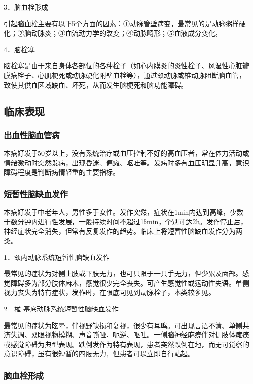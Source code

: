3．脑血栓形成

引起脑血栓主要有以下5个方面的因素：①动脉管壁病变，最常见的是动脉粥样硬化；②脑动脉炎；③血流动力学的改变；④动脉畸形；⑤血液成分变化。

4．脑栓塞

脑栓塞是由于来自身体各部位的各种栓子（如心内膜炎的炎性栓子、风湿性心脏瓣膜病栓子、心肌梗死或动脉硬化附壁血栓等），通过颈动脉或椎动脉阻断脑血管，致使其供血区域缺血、坏死，从而发生脑梗死和脑功能障碍。

\subsection{临床表现}

\subsubsection{出血性脑血管病}

本病好发于50岁以上，没有系统治疗或血压控制不好的高血压者，常在体力活动或情绪激动时突然发病，出现昏迷、偏瘫、呕吐等。发病时多有血压明显升高，意识障碍程度是判断病情轻重的主要指标。

\subsubsection{短暂性脑缺血发作}

本病好发于中老年人，男性多于女性。发作突然，症状在1min内达到高峰，少数于数分钟内进行性发展，一般持续时间不超过15min，个别可达2h。发作停止后，神经症状完全消失，但常有反复发作的趋势。临床上将短暂性脑缺血发作分为两类。

1．颈内动脉系统短暂性脑缺血发作

最常见的症状为对侧上肢或下肢无力，也可只限于一只手无力，但少累及面部。感觉障碍多为部分肢体麻木，感觉很少完全丧失。可产生感觉性或运动性失语。单侧视力丧失为特有症状，发作时，在眼底可见到动脉栓子，本类较多见。

2．椎-基底动脉系统短暂性脑缺血发作

最常见的症状为眩晕，伴视野缺损和复视，很少有耳鸣。可出现言语不清、单侧共济失调、双眼视物模糊、声音嘶哑、呃逆、呕吐。一侧脑神经麻痹伴对侧肢体瘫痪或感觉障碍为典型表现。跌倒发作为特有表现，患者突然跌倒在地，而无可觉察的意识障碍，虽有很短暂的四肢无力，但患者可以立即自行站起。

\subsubsection{脑血栓形成}

